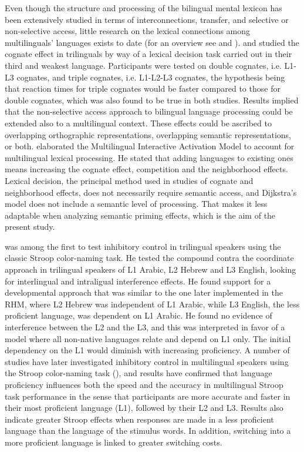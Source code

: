 \documentclass[output=paper,colorlinks,citecolor=brown,nonflat]{langsci/langscibook}
\begin{document}
Even though the structure and processing of the bilingual mental lexicon has been extensively studied in terms of interconnections, transfer, and selective or non-selective access, little research on the lexical connections among multilinguals’ languages exists to date (for an overview see \citealt{CenozEtAl2003} and \citealt{Szubko-Sitarek2015}). \citet{Szubko-Sitarek2011} and \citet{LemhöferEtAl2004} studied the cognate effect in trilinguals by way of a lexical decision task carried out in their third and weakest language. Participants were tested on double cognates, i.e. L1-L3 cognates, and triple cognates, i.e. L1-L2-L3 cognates, the hypothesis being that reaction times for triple cognates would be faster compared to those for double cognates, which was also found to be true in both studies. Results implied that the non-selective access approach to bilingual language processing could be extended also to a multilingual context. These effects could be ascribed to overlapping orthographic representations, overlapping semantic representations, or both. \citet{Dijkstra2003} elaborated the Multilingual Interactive Activation Model to account for multilingual lexical processing. He stated that adding languages to existing ones means increasing the cognate effect, competition and the neighborhood effects. Lexical decision, the principal method used in studies of cognate and neighborhood effects, does not necessarily require semantic access, and Dijkstra’s model does not include a semantic level of processing. That makes it less adaptable when analyzing semantic priming effects, which is the aim of the present study.

\citet{Abunuwara1992} was among the first to test inhibitory control in trilingual speakers using the classic Stroop color-naming task. He tested the compound contra the coordinate approach in trilingual speakers of L1 Arabic, L2 Hebrew and L3 English, looking for interlingual and intraligual interference effects. He found support for a developmental approach that was similar to the one later implemented in the RHM, where L2 Hebrew was independent of L1 Arabic, while L3 English, the less proficient language, was dependent on L1 Arabic. He found no evidence of interference between the L2 and the L3, and this was interpreted in favor of a model where all non-native languages relate and depend on L1 only. The initial dependency on the L1 would diminish with increasing proficiency. A number of studies have later investigated inhibitory control in multilingual speakers using the Stroop color-naming task (\citealt{SchwieterSunderman2011, LinckEtAl2012, MarianEtAl2013}), and results have confirmed that language proficiency influences both the speed and the accuracy in multilingual Stroop task performance in the sense that participants are more accurate and faster in their most proficient language (L1), followed by their L2 and L3. Results also indicate greater Stroop effects when responses are made in a less proficient language than the language of the stimulus words. In addition, switching into a more proficient language is linked to greater switching costs.
\end{document}
